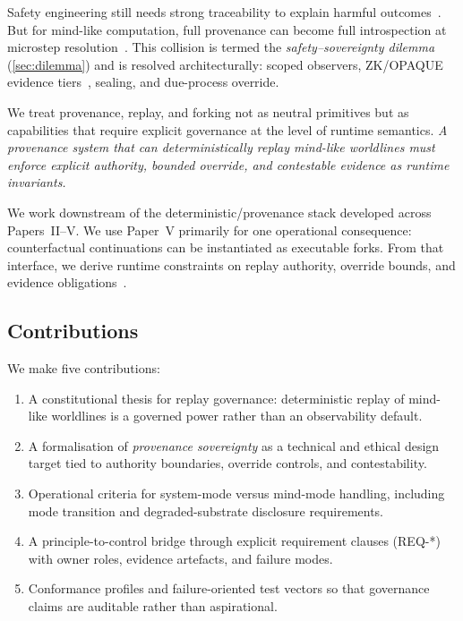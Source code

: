 \documentclass[11pt]{article}
\theoremstyle{definition}
\theoremstyle{plain}
\theoremstyle{remark}
\begin{document}
Safety engineering still needs strong traceability to explain harmful outcomes~\cite{simmhan2005,weitzner2008,schneierkelsey1999}.
But for mind-like computation, full provenance can become full introspection at microstep resolution~\cite{nissenbaum2004}.
This collision is termed the \emph{safety--sovereignty dilemma} (\cref{sec:dilemma}) and is resolved architecturally:
scoped observers, ZK/OPAQUE evidence tiers~\cite{goldwasser1989,bensasson2018}, sealing, and due-process override.

We treat provenance, replay, and forking not as neutral primitives but as
capabilities that require explicit governance at the level of runtime semantics.
\emph{A provenance system that can deterministically replay mind-like worldlines must enforce explicit authority, bounded override, and contestable evidence as runtime invariants.}

We work downstream of the deterministic/provenance stack developed across Papers~II--V.
We use Paper~V primarily for one operational consequence: counterfactual continuations can be
instantiated as executable forks.
From that interface, we derive runtime constraints on replay authority, override bounds,
and evidence obligations~\cite{ross_paper_v}.

\subsection{Contributions}
We make five contributions:
\begin{enumerate}[leftmargin=*]
  \item A constitutional thesis for replay governance: deterministic replay of mind-like
  worldlines is a governed power rather than an observability default.
  \item A formalisation of \emph{provenance sovereignty} as a technical and ethical design target tied to
  authority boundaries, override controls, and contestability.
  \item Operational criteria for system-mode versus mind-mode handling, including mode
  transition and degraded-substrate disclosure requirements.
  \item A principle-to-control bridge through explicit requirement
  clauses (REQ-*) with owner roles, evidence artefacts, and failure modes.
  \item Conformance profiles and failure-oriented test vectors so that governance claims
  are auditable rather than aspirational.
\end{enumerate}
\end{document}

